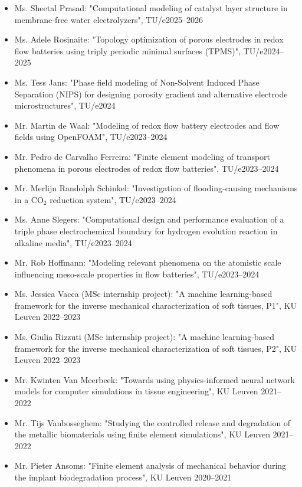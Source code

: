 \documentclass{cv}
\begin{document}
\begin{itemize}[itemsep=-0.2ex]
\item
Ms. Sheetal Prasad: "Computational modeling of catalyst layer structure in membrane-free water electrolyzers", TU/e\hfill 2025--2026
\item
Ms. Adele Rosinaite: "Topology optimization of porous electrodes in redox flow batteries using triply periodic minimal surfaces (TPMS)", TU/e\hfill 2024--2025
\item
Ms. Tess Jans: "Phase field modeling of Non-Solvent Induced Phase Separation (NIPS) for designing porosity gradient and alternative electrode microstructures", TU/e\hfill 2024
\item
Mr. Martin de Waal: "Modeling of redox flow battery electrodes and flow fields using OpenFOAM", TU/e\hfill 2023--2024
\item
Mr. Pedro de Carvalho Ferreira: "Finite element modeling of transport phenomena in porous electrodes of redox flow batteries", TU/e\hfill 2023--2024
\item
Mr. Merlijn Randolph Schinkel: "Investigation of flooding-causing
mechanisms in a $\textrm{CO}_2$ reduction system", TU/e\hfill 2023--2024
\item
Ms. Anne Slegers: "Computational design and performance evaluation of a triple phase electrochemical boundary for hydrogen evolution reaction in alkaline media", TU/e\hfill 2023--2024
\item
Mr. Rob Hoffmann: "Modeling relevant phenomena on the atomistic scale influencing meso-scale properties in flow batteries", TU/e\hfill 2023--2024
\item
Ms. Jessica Vacca (MSc internship project): "A machine learning-based framework for the inverse mechanical characterization of soft tissues, P1", KU Leuven \hfill 2022--2023
\item
Ms. Giulia Rizzuti (MSc internship project): "A machine learning-based framework for the inverse mechanical characterization of soft tissues, P2", KU Leuven \hfill 2022--2023
\item 
Mr. Kwinten Van Meerbeek: "Towards using physics-informed neural network models for computer simulations in tissue engineering", KU Leuven \hfill 2021--2022
\item 
Mr. Tijs Vanbosseghem: "Studying the controlled release and
degradation of the metallic biomaterials using finite element simulations", KU Leuven \hfill 2021--2022
\item 
Mr. Pieter Ansoms: "Finite element analysis of mechanical behavior during the implant biodegradation process", KU Leuven \hfill 2020--2021
\end{itemize}
\end{document}

